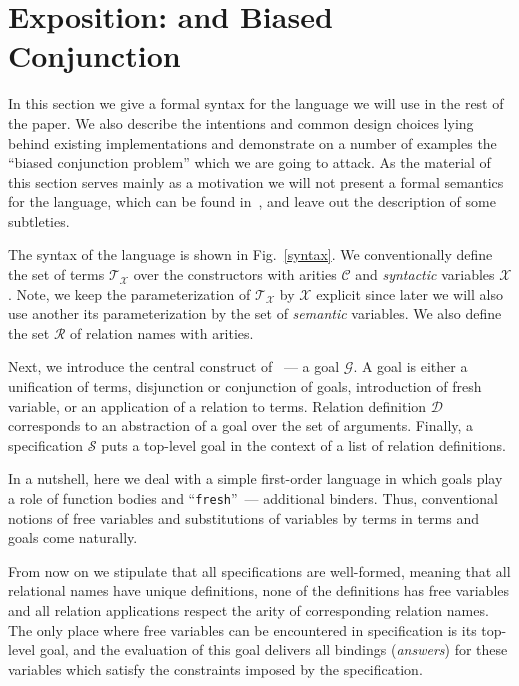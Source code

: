 \section{Exposition: \mk and Biased Conjunction}
\label{sec:exposition}

In this section we give a formal syntax for the language we will use in the rest of the paper. We also describe the intentions and common design
choices lying behind existing implementations and demonstrate on a number of examples the ``biased conjunction problem'' which we are going to attack.
As the material of this section serves mainly as a motivation we will not present a formal semantics for the language, which can be found in~\cite{fair:semantics},
and leave out the description of some subtleties.

The syntax of the language is shown in Fig.~\ref{syntax}. We conventionally define the set of terms $\mathcal{T}_\mathcal{X}$
over the constructors with arities $\mathcal{C}$ and \emph{syntactic} variables $\mathcal{X}$. Note, we keep the parameterization of $\mathcal{T}_\mathcal{X}$ by $\mathcal{X}$
explicit since later we will also use another its parameterization by the set of \emph{semantic} variables. We also define the set $\mathcal{R}$ of relation names with arities.

Next, we introduce the central construct of \mk~--- a goal $\mathcal{G}$. A goal is either a unification of terms, disjunction or conjunction of goals, introduction of fresh variable,
or an application of a relation to terms. Relation definition $\mathcal{D}$ corresponds to an abstraction of a goal over the set of arguments. Finally, a specification $\mathcal{S}$
puts a top-level goal in the context of a list of relation definitions.

In a nutshell, here we deal with a simple first-order language in which goals play a role of function bodies and ``\lstinline|fresh|''~--- additional binders. Thus,
conventional notions of free variables and substitutions of variables by terms in terms and goals come naturally.

From now on we stipulate that all specifications are well-formed, meaning that all relational names have unique definitions, none of the definitions has
free variables and all relation applications respect the arity of corresponding relation names. The only place where free variables can be encountered in specification
is its top-level goal, and the evaluation of this goal delivers all bindings (\emph{answers}) for these variables which satisfy the constraints imposed by the specification.


